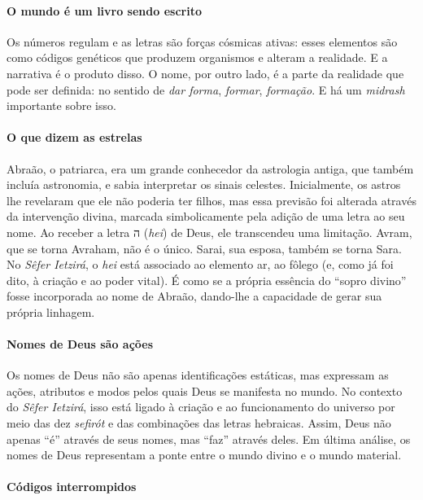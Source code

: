 \paragraph{O mundo é um livro sendo escrito} Os números regulam e as letras são forças cósmicas ativas: esses elementos são como códigos genéticos que produzem organismos e alteram a realidade. E a narrativa é o produto disso. O nome, por outro lado, é a parte da realidade que pode ser definida: no sentido de \textit{dar forma}, \textit{formar}, \textit{formação}. E há um \textit{midrash} importante sobre isso.

\paragraph{O que dizem as estrelas} Abraão, o patriarca, era um grande conhecedor da astrologia antiga, que também incluía astronomia, e sabia interpretar os sinais celestes. Inicialmente, os astros lhe revelaram que ele não poderia ter filhos, mas essa previsão foi alterada através da intervenção divina, marcada simbolicamente pela adição de uma letra ao seu nome. Ao receber a letra {\frank ה} (\textit{hei}) de Deus, ele transcendeu uma limitação. Avram, que se torna Avraham, não é o único. Sarai, sua esposa, também se torna Sara. No \textit{Sêfer Ietzirá}, o \textit{hei} está associado ao elemento ar, ao fôlego (e, como já foi dito, à criação e ao poder vital). É como se a própria essência do ``sopro divino'' fosse incorporada ao nome de Abraão, dando-lhe a capacidade de gerar sua própria linhagem.

\paragraph{Nomes de Deus são ações} Os nomes de Deus não são apenas identificações estáticas, mas expressam as ações, atributos e modos pelos quais Deus se manifesta no mundo. No contexto do \textit{Sêfer Ietzirá}, isso está ligado à criação e ao funcionamento do universo por meio das dez \textit{sefirót} e das combinações das letras hebraicas. Assim, Deus não apenas ``é'' através de seus nomes, mas ``faz'' através deles. Em última análise, os nomes de Deus representam a ponte entre o mundo divino e o mundo material.  

\paragraph{Códigos interrompidos} 


